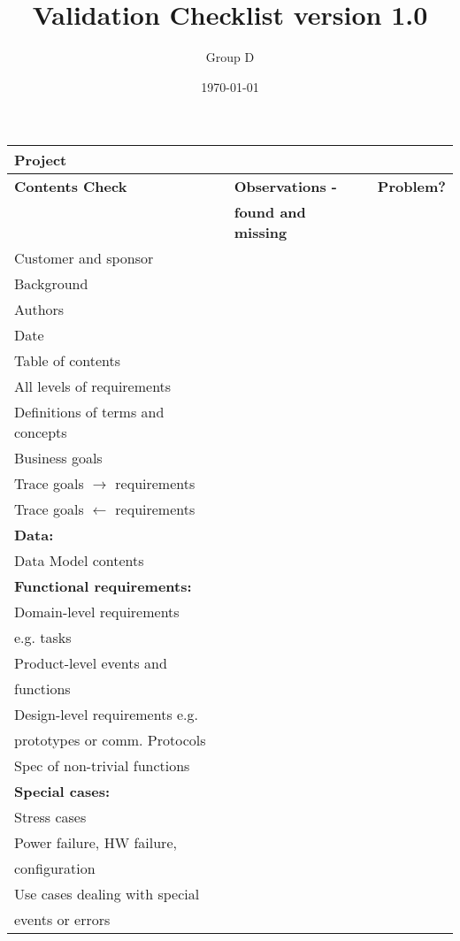 \documentclass[a4paper]{article}
\title{Validation Checklist version 1.0}
\author{Group D}
\date{\today}
\begin{document}
	\maketitle
	\thispagestyle{empty}
	\setcounter{page}{0}

	\begin{tabular}{|l|l|l|} \hline 
		\multicolumn{3}{|l|}{\textbf{Project}} \\ \hline \hline
		\textbf{Contents Check}	& \textbf{Observations - }	& \textbf{Problem?} \\
			& \textbf{found and missing}	&	\\ \hline
		Customer and sponsor & & \\ \hline
		Background	&	&	\\ \hline
		Authors &	& \\ \hline
		Date &	& \\ \hline
		Table of contents	&	& \\ \hline
		All levels of requirements	&	& \\ \hline
		Definitions of terms and concepts	&	& \\ \hline
		Business goals	&	&	\\ \hline
		Trace goals \(\rightarrow\) requirements	&	&	\\ \hline
		Trace goals \(\leftarrow\) requirements	&	&	\\ \hline
		\textbf{Data:}	&	&	\\ 
		Data Model contents	&	&	\\ \hline
		\textbf{Functional requirements:}	&	&	\\
		Domain-level requirements	&	&	\\ 
		e.g. tasks	&	&	\\ \hline
		Product-level events and	&	&	\\
		functions	&	&	\\ \hline
		Design-level requirements e.g.	&	&	\\
		prototypes or comm. Protocols	&	&	\\ \hline
		Spec of non-trivial functions	&	&	\\ \hline
		\textbf{Special cases:}	&	&	\\
		Stress cases	&	&	\\ \hline
		Power failure, HW failure,	&	&	\\
		configuration	&	&	\\ \hline
		Use cases dealing with special	&	&	\\
		events or errors	&	&	\\ \hline

\end{tabular}
\end{document}
